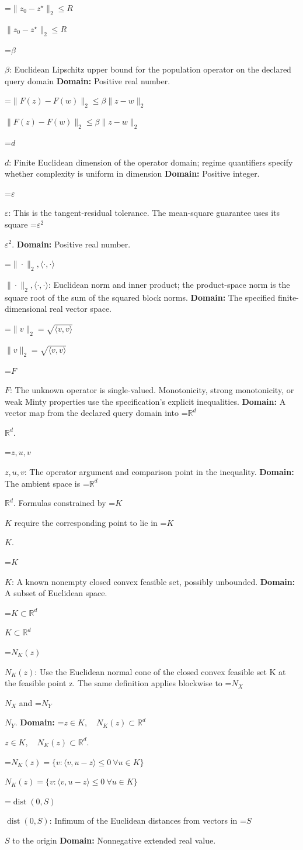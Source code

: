 \documentclass[10pt,a4paper]{article}
\newcommand{\AtlasMath}[1]{\par\begingroup\centering\setbox0=\hbox{$\displaystyle #1$}\ifdim\wd0>1.4\linewidth\typeout{ATLAS WIDE FORMULA: \the\wd0}\fi\ifdim\wd0>\linewidth\resizebox{\linewidth}{!}{\box0}\else\box0\fi\par\endgroup}
\newcommand{\AtlasInlineMath}[1]{\begingroup\setbox0=\hbox{$#1$}\ifdim\wd0>.4\linewidth\endgroup\AtlasMath{#1}\else\endgroup$#1$\fi}
\begin{document}
\AtlasInlineMath{\|z_0-z^\star\|_2\le R}

\AtlasInlineMath{\beta}: Euclidean Lipschitz upper bound for the population operator on the declared query domain \textbf{Domain:} Positive real number.

\AtlasInlineMath{\|F(z)-F(w)\|_2\le\beta\|z-w\|_2}

\AtlasInlineMath{d}: Finite Euclidean dimension of the operator domain; regime quantifiers specify whether complexity is uniform in dimension \textbf{Domain:} Positive integer.

\AtlasInlineMath{\varepsilon}: This is the tangent-residual tolerance. The mean-square guarantee uses its square \AtlasInlineMath{\varepsilon^2}. \textbf{Domain:} Positive real number.

\AtlasInlineMath{\|\cdot\|_2,\langle\cdot,\cdot\rangle}: Euclidean norm and inner product; the product-space norm is the square root of the sum of the squared block norms. \textbf{Domain:} The specified finite-dimensional real vector space.

\AtlasInlineMath{\|v\|_2=\sqrt{\langle v,v\rangle}}

\AtlasInlineMath{F}: The unknown operator is single-valued. Monotonicity, strong monotonicity, or weak Minty properties use the specification’s explicit inequalities. \textbf{Domain:} A vector map from the declared query domain into \AtlasInlineMath{\mathbb R^d}.

\AtlasInlineMath{z,u,v}: The operator argument and comparison point in the inequality. \textbf{Domain:} The ambient space is \AtlasInlineMath{\mathbb R^d}. Formulas constrained by \AtlasInlineMath{K} require the corresponding point to lie in \AtlasInlineMath{K}.

\AtlasInlineMath{K}: A known nonempty closed convex feasible set, possibly unbounded. \textbf{Domain:} A subset of Euclidean space.

\AtlasInlineMath{K\subset\mathbb R^d}

\AtlasInlineMath{N_K(z)}: Use the Euclidean normal cone of the closed convex feasible set K at the feasible point z. The same definition applies blockwise to \AtlasInlineMath{N_X} and \AtlasInlineMath{N_Y}. \textbf{Domain:} \AtlasInlineMath{z\in K,\quad N_K(z)\subset\mathbb R^d}.

\AtlasInlineMath{N_K(z)=\{v:\langle v,u-z\rangle\le0\ \forall u\in K\}}

\AtlasInlineMath{\operatorname{dist}(0,S)}: Infimum of the Euclidean distances from vectors in \AtlasInlineMath{S} to the origin \textbf{Domain:} Nonnegative extended real value.
\end{document}
